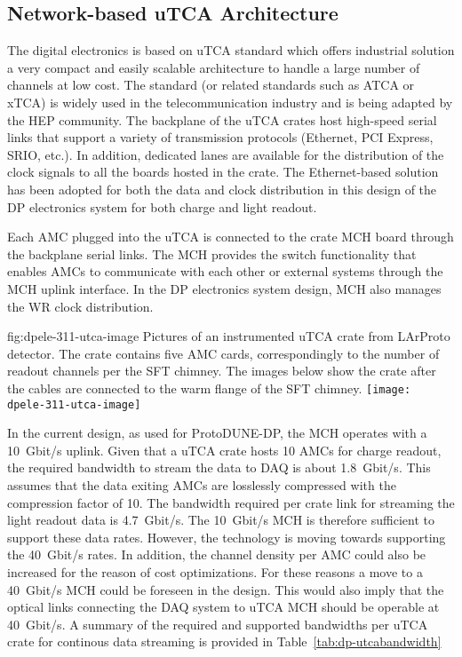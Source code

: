 \subsection{Network-based uTCA Architecture}
\label{sec:fddp-tpc-elec-design-utca}

The digital electronics is based on uTCA standard which offers industrial solution a very compact and easily scalable architecture to handle a large number of channels at low cost.  The standard (or related standards such as ATCA or xTCA) is widely used in the telecommunication industry and is being adapted by the HEP community. The backplane of the uTCA crates host high-speed serial links that support a variety of transmission protocols (Ethernet, PCI Express, SRIO, etc.). In addition, dedicated lanes are available for the distribution of the clock signals to all the boards hosted in the crate.  The Ethernet-based solution has been adopted for both the data and clock distribution in this design of the DP electronics system for both charge and light readout. 

Each AMC plugged into the uTCA is connected to the crate MCH board through the backplane serial links. The MCH provides the switch functionality that enables AMCs to communicate with each other or external systems through the MCH uplink interface. In the DP electronics system design, MCH also manages the WR clock distribution. 

\begin{dunefigure}{fig:dpele-311-utca-image}
{Pictures of an instrumented uTCA crate from LArProto detector. The crate contains five AMC cards, correspondingly to the number of readout channels per the SFT chimney. The images below show the crate after the  cables are connected to the warm flange of the SFT chimney.}
\texttt{[image: dpele-311-utca-image]}
\end{dunefigure}

In the current design, as used for ProtoDUNE-DP, the MCH operates with a \SI{10}{Gbit/s} uplink. Given that a uTCA crate hosts \num{10} AMCs for charge readout, the required bandwidth to stream the data to DAQ is about \SI{1.8}{Gbit/s}. This assumes that the data exiting AMCs are losslessly compressed with the compression factor of \num{10}. The bandwidth required per crate link for streaming the light readout data is \SI{4.7}{Gbit/s}. The \SI{10}{Gbit/s} MCH is therefore sufficient to support these data rates. However, the technology is moving towards supporting the \SI{40}{Gbit/s} rates. In addition, the channel density per AMC could also be increased for the reason of cost optimizations. For these reasons a move to a \SI{40}{Gbit/s} MCH could be foreseen in the design. This would also imply that the optical links connecting the DAQ system to uTCA MCH should be operable at \SI{40}{Gbit/s}. A summary of the required and supported bandwidths per uTCA crate for continous data streaming is provided in Table~\ref{tab:dp-utcabandwidth}

